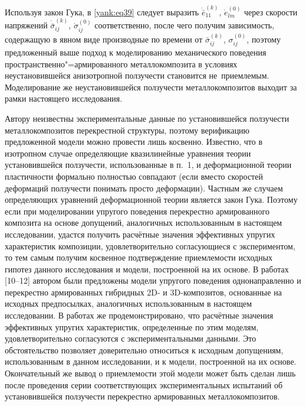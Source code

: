 Используя закон Гука, в \eqref{yank:eq39} следует выразить $\dot {\bar {e}}_{11}^{(k)} $,
$\dot {e}_{lm}^{(0)} $ через скорости напряжений $\dot {\bar {\sigma
}}_{ij}^{(k)}$, $\dot {\sigma }_{ij}^{(0)} $ соответственно, после чего
получим зависимость, содержащую в явном виде производные по времени от $\bar
{\sigma }_{ij}^{(k)} $, $\sigma _{ij}^{(0)} $, поэтому предложенный выше
подход к моделированию механического поведения пространственно"=армированного
металлокомпозита в условиях неустановившейся анизотропной ползучести
становится не~приемлемым. Моделирование же неустановившейся ползучести
металлокомпозитов выходит за рамки настоящего исследования.

\smallskip

 Автору неизвестны
экспериментальные данные по установившейся ползучести металлокомпозитов
перекрестной структуры, поэтому верификацию предложенной модели можно
провести лишь косвенно. Известно, что в изотропном случае определяющие
квазилинейные уравнения теории установившейся ползучести, использованные в
п.~1, и деформационной теории пластичности формально полностью
совпадают \cite{yank:bib3,yank:bib8,yank:bib9} (если вместо скоростей деформаций ползучести понимать
просто деформации). Частным же случаем определяющих уравнений деформационной
теории является закон Гука. Поэтому если при моделировании упругого
поведения перекрестно армированного композита на основе допущений,
аналогичных использованным в настоящем исследовании, удастся получить
расчётные значения эффективных упругих характеристик композиции,
удовлетворительно согласующиеся с экспериментом, то тем самым получим
косвенное подтверждение приемлемости исходных гипотез данного исследования и
модели, построенной на их основе. В работах [10--12] автором были предложены
модели упругого поведения однонаправленно и перекрестно армированных
гибридных 2D- и 3D-композитов, основанные на исходных предпосылках,
аналогичных использованным в настоящем исследовании. В работах же \cite{yank:bib11,yank:bib13,yank:bib14}
продемонстрировано, что расчётные значения эффективных упругих
характеристик, определенные по этим моделям, удовлетворительно согласуются с
экспериментальными данными. Это обстоятельство позволяет доверительно
относиться к исходным допущениям, использованным в данном исследовании, и к
модели, построенной на их основе. Окончательный же вывод о приемлемости этой
модели может быть сделан лишь после проведения серии соответствующих
экспериментальных испытаний об установившейся ползучести перекрестно
армированных металлокомпозитов.

